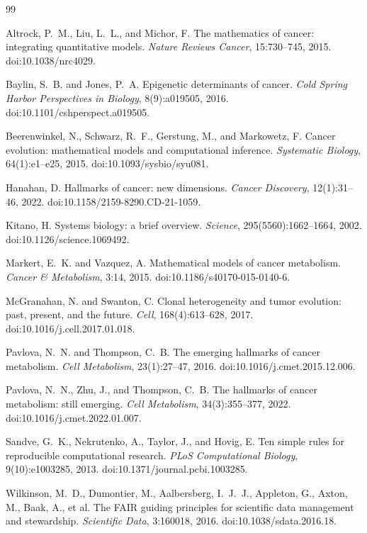 \documentclass[12pt,a4paper]{article}
\begin{document}
\begin{thebibliography}{99}

Altrock, P.~M., Liu, L.~L., and Michor, F.
\newblock The mathematics of cancer: integrating quantitative models.
\newblock \emph{Nature Reviews Cancer}, 15:730--745, 2015.
\newblock doi:10.1038/nrc4029.

Baylin, S.~B. and Jones, P.~A.
\newblock Epigenetic determinants of cancer.
\newblock \emph{Cold Spring Harbor Perspectives in Biology}, 8(9):a019505, 2016.
\newblock doi:10.1101/cshperspect.a019505.

Beerenwinkel, N., Schwarz, R.~F., Gerstung, M., and Markowetz, F.
\newblock Cancer evolution: mathematical models and computational inference.
\newblock \emph{Systematic Biology}, 64(1):e1--e25, 2015.
\newblock doi:10.1093/sysbio/syu081.

Hanahan, D.
\newblock Hallmarks of cancer: new dimensions.
\newblock \emph{Cancer Discovery}, 12(1):31--46, 2022.
\newblock doi:10.1158/2159-8290.CD-21-1059.

Kitano, H.
\newblock Systems biology: a brief overview.
\newblock \emph{Science}, 295(5560):1662--1664, 2002.
\newblock doi:10.1126/science.1069492.

Markert, E.~K. and Vazquez, A.
\newblock Mathematical models of cancer metabolism.
\newblock \emph{Cancer \& Metabolism}, 3:14, 2015.
\newblock doi:10.1186/s40170-015-0140-6.

McGranahan, N. and Swanton, C.
\newblock Clonal heterogeneity and tumor evolution: past, present, and the future.
\newblock \emph{Cell}, 168(4):613--628, 2017.
\newblock doi:10.1016/j.cell.2017.01.018.

Pavlova, N.~N. and Thompson, C.~B.
\newblock The emerging hallmarks of cancer metabolism.
\newblock \emph{Cell Metabolism}, 23(1):27--47, 2016.
\newblock doi:10.1016/j.cmet.2015.12.006.

Pavlova, N.~N., Zhu, J., and Thompson, C.~B.
\newblock The hallmarks of cancer metabolism: still emerging.
\newblock \emph{Cell Metabolism}, 34(3):355--377, 2022.
\newblock doi:10.1016/j.cmet.2022.01.007.

Sandve, G.~K., Nekrutenko, A., Taylor, J., and Hovig, E.
\newblock Ten simple rules for reproducible computational research.
\newblock \emph{PLoS Computational Biology}, 9(10):e1003285, 2013.
\newblock doi:10.1371/journal.pcbi.1003285.

Wilkinson, M.~D., Dumontier, M., Aalbersberg, I.~J.~J., Appleton, G., Axton, M., Baak, A., et al.
\newblock The FAIR guiding principles for scientific data management and stewardship.
\newblock \emph{Scientific Data}, 3:160018, 2016.
\newblock doi:10.1038/sdata.2016.18.

\end{thebibliography}
\end{document}
